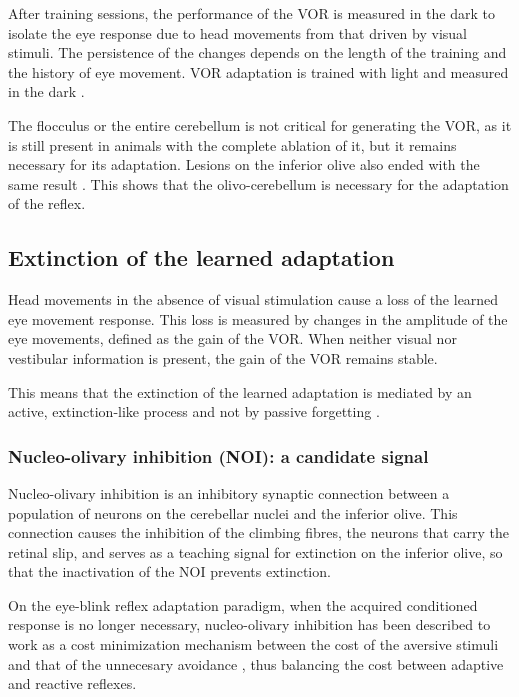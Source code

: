 \documentclass[12pt, a4paper,twoside]{tesi_upf}
\begin{document}
After training sessions, the performance of the VOR is measured in the dark to isolate the eye response due to head movements from that driven by visual stimuli. The persistence of the changes depends on the length of the training and the history of eye movement. VOR adaptation is trained with light and measured in the dark \cite{Boyden2004}.

The flocculus or the entire cerebellum is not critical for generating the VOR, as it is still present in animals with the complete ablation of it, but it remains necessary for its adaptation. Lesions on the inferior olive also ended with the same result \cite{Ito2006}. This shows that the olivo-cerebellum is necessary for the adaptation of the reflex.

\subsection{Extinction of the learned adaptation}

Head movements in the absence of visual stimulation cause a loss of the learned eye movement response. This loss is measured by changes in the amplitude of the eye movements, defined as the gain of the VOR. When neither visual nor vestibular information is present, the gain of the VOR remains stable.

This means that the extinction of the learned adaptation is mediated by an active, extinction-like process and not by passive forgetting \cite{Cohen2004}.

\subsubsection{Nucleo-olivary inhibition (NOI): a candidate signal}

Nucleo-olivary inhibition is an inhibitory synaptic connection between a population of neurons on the cerebellar nuclei and the inferior olive. This connection causes the inhibition of the climbing fibres, the neurons that carry the retinal slip, and serves as a teaching signal for extinction \cite{Medina2002} on the inferior olive, so that the inactivation of the NOI prevents extinction.

On the eye-blink reflex adaptation paradigm, when the acquired conditioned response is no longer necessary, nucleo-olivary inhibition has been described to work as a cost minimization mechanism between the cost of the aversive stimuli and that of the unnecesary avoidance \cite{Brandi2013}, thus balancing the cost between adaptive and reactive reflexes.
\end{document}
